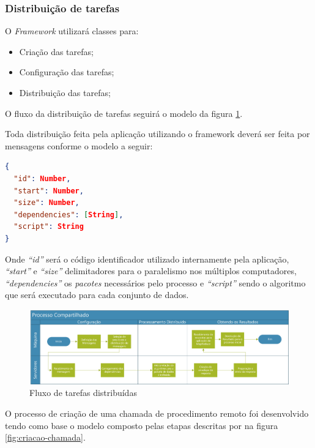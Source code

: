 \subsubsection{Distribui\c{c}\~{a}o de tarefas}
O \emph{Framework} utilizará classes para:
\begin{itemize}
  \item Criação das tarefas;
  \item Configuração das tarefas;
  \item Distribuição das tarefas;
\end{itemize}

O fluxo da distribuição de tarefas seguirá o modelo da figura \ref{fig:dist-tarefas}.

Toda distribuição feita pela aplicação utilizando o framework deverá ser feita
por mensagens conforme o modelo a seguir:


\begin{lstlisting}[language=json, firstnumber=1]
{
  "id": Number,
  "start": Number,
  "size": Number,
  "dependencies": [String],
  "script": String
}
\end{lstlisting}

Onde \emph{``id''} será o código identificador utilizado internamente pela
aplicação, \emph{``start''} e \emph{``size''} delimitadores para o paralelismo
nos múltiplos computadores, \emph{``dependencies''} os \emph{pacotes}
necessários pelo processo e \emph{``script''} sendo o algoritmo que será
executado para cada conjunto de dados.

\begin{figure}[htb]
	\caption{\label{fig:dist-tarefas}Fluxo de tarefas distribuídas}
	\begin{center}
		\includegraphics[width=1\textwidth]{img/processamento-distribuido.jpg}
	\end{center}
\end{figure}

O processo de criação de uma chamada de procedimento remoto foi desenvolvido
tendo como base o modelo composto pelas etapas descritas por  na
figura \ref{fig:criacao-chamada}.

